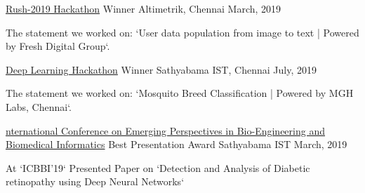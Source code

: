 

\begin{cventries}

  \cventry
    {\href{https://rush.hackerearth.com}{Rush-2019 Hackathon}} %
    {Winner} %
    {Altimetrik, Chennai} %
    {March, 2019} %
    {
      \begin{cvitems} %
        \item {The statement we worked on: `User data population from image to text | Powered by Fresh Digital Group`.}
      \end{cvitems}
    }
    
  \cventry
    {\href{}{Deep Learning Hackathon}} %
    {Winner} %
    {Sathyabama IST, Chennai} %
    {July, 2019} %
    {
      \begin{cvitems} %
        \item {The statement we worked on: `Mosquito Breed Classification | Powered by MGH Labs, Chennai`.}
      \end{cvitems}
    }

  \cventry
    {\href{http://icbbi2019.in}{nternational Conference on Emerging Perspectives in Bio-Engineering and Biomedical Informatics}} %
    {Best Presentation Award} %
    {Sathyabama IST} %
    {March, 2019} %
    {
      \begin{cvitems} %
        \item {At `ICBBI'19`
Presented Paper on `Detection and Analysis of Diabetic retinopathy using Deep Neural Networks` }
      \end{cvitems}
    }



\end{cventries}
